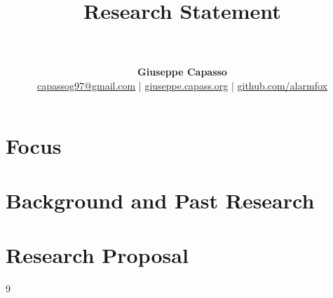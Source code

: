 \documentclass[11pt,a4paper]{article}
\title{
    \vspace{-1in}
    \large \textbf{Research Statement}\\
    \huge \textbf{}\\
    \large \textit{}
}
\author{\textbf{Giuseppe Capasso} \\ \href{mailto:capassog97@gmail.com}{capassog97@gmail.com} | \href{https://giuseppe.capass.org}{giuseppe.capass.org} | \href{https://github.com/alarmfox}{github.com/alarmfox}}
\date{}
\begin{document}
\maketitle

\section{Focus}

\section{Background and Past Research}

\section{Research Proposal}


\begin{thebibliography}{9}
\end{thebibliography}
\end{document}
